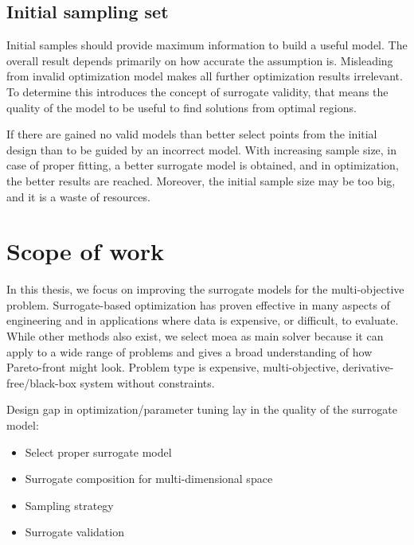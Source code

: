         \subsection{Initial sampling set}
        Initial samples should provide maximum information to build a useful model. The overall result depends primarily on how accurate the assumption is. Misleading from invalid optimization model makes all further optimization results irrelevant. To determine this introduces the concept of surrogate validity, that means the quality of the model to be useful to find solutions from optimal regions. 

        If there are gained no valid models than better select points from the initial design than to be guided by an incorrect model. With increasing sample size, in case of proper fitting, a better surrogate model is obtained, and in optimization, the better results are reached. Moreover, the initial sample size may be too big, and it is a waste of resources. 


    \section{Scope of work}
        In this thesis, we focus on improving the surrogate models for the multi-objective problem. Surrogate-based optimization has proven effective in many aspects of engineering and in applications where data is expensive, or difficult, to evaluate. While other methods also exist, we select \gls{moea} as main solver because it can apply to a wide range of problems and gives a broad understanding of how Pareto-front might look. Problem type is expensive, multi-objective, derivative-free/black-box system without constraints.

        Design gap in optimization/parameter tuning lay in the quality of the surrogate model:
            \begin{itemize}
                \item Select proper surrogate model
                \item Surrogate composition for multi-dimensional space
                \item Sampling strategy
                \item Surrogate validation
            \end{itemize}

